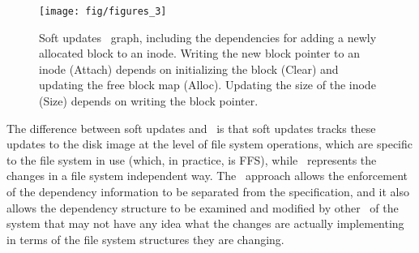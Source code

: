 \begin{figure}[htb]
  \centering
  \texttt{[image: fig/figures\_3]}
  \caption{\label{fig:softupdate} Soft updates \chdesc\ graph,
  including the dependencies for adding a newly allocated block to an
  inode. Writing the new block pointer to an inode (Attach) depends on
  initializing the block (Clear) and updating the free block map (Alloc).
  Updating the size of the inode (Size) depends on writing the block
  pointer.}
\end{figure}

The difference between soft updates and \Kudos\ is that soft updates tracks
these updates to the disk image at the level of file system operations, which
are specific to the file system in use (which, in practice, is FFS), while
\Kudos\ represents the changes in a file system independent way. The \Kudos\
approach allows the enforcement of the dependency information to be separated
from the specification, and it also allows the dependency structure to be
examined and modified by other \modules\ of the system that may not have any
idea what the changes are actually implementing in terms of the file system
structures they are changing.
